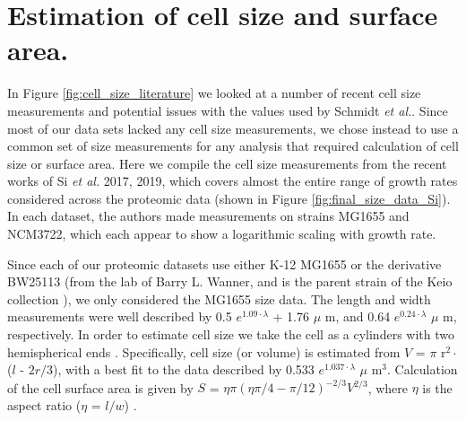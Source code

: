 \section{Estimation of cell size and surface area.}

In Figure \ref{fig:cell_size_literature} we looked at a number of recent cell
size measurements and potential issues with the values used by Schmidt
\textit{et al.}. Since most of our data sets lacked any cell size measurements,
we chose instead to use a common set of size measurements for any analysis
that required calculation of cell size or surface area. Here we compile the
cell size measurements from the recent works of Si \textit{et al.} 2017, 2019,
which covers almost the entire range of growth rates considered across the
proteomic data (shown in Figure \ref{fig:final_size_data_Si}). In each dataset,
the authors made measurements on strains MG1655 and NCM3722, which each appear
to show a logarithmic scaling with growth rate.

Since each of our proteomic datasets use either K-12 MG1655 or the derivative
BW25113 (from the lab of Barry L. Wanner, and is the parent strain of the Keio
collection \cite{datsenko2000}), we only considered the MG1655 size data. The
length and width measurements  were well described by 0.5 $e^{1.09 \cdot
\lambda}$ + 1.76 $\mu$ m, and 0.64 $e^{0.24 \cdot \lambda}$ $\mu$ m,
respectively. In order to estimate cell size we take the cell as a cylinders
with two hemispherical ends \cite{si2017, basan2015}. Specifically,  cell size
(or volume) is estimated from $V$ = $\pi$ r$^2 \cdot$ ($l$ - $2r/3$), with a
best fit to the data described by 0.533 $e^{1.037 \cdot \lambda}$ $\mu$ m$^3$.
Calculation of the cell surface area is given by $S$ = $\eta \pi (\eta \pi / 4 -
\pi/12)^{-2/3} V^{2/3}$, where $\eta$ is the aspect ratio ($\eta$ = $l/w$)
\cite{ojkic2019}.

